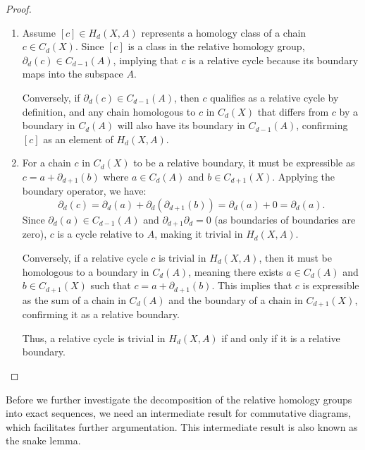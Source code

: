 \begin{proof}
	\begin{enumerate}
		\item Assume $[c] \in H_{d}(X,A)$ represents a homology class of a chain $c \in
			C_{d}(X)$. Since $[c]$ is a class in the relative homology group, $\partial
			_{d}(c) \in C_{d-1}(A)$, implying that $c$ is a relative cycle because its
			boundary maps into the subspace $A$.

			Conversely, if $\partial_{d}(c) \in C_{d-1}(A)$, then $c$ qualifies as a
			relative cycle by definition, and any chain homologous to $c$ in $C_{d}(X)$
			that differs from $c$ by a boundary in $C_{d}(A)$ will also have its boundary
			in $C_{d-1}(A)$, confirming $[c]$ as an element of $H_{d}(X,A)$.

		\item For a chain $c$ in $C_{d}(X)$ to be a relative boundary, it must be
			expressible as $c = a + \partial_{d+1}(b)$ where $a \in C_{d}(A)$ and
			$b \in C_{d+1}(X)$. Applying the boundary operator, we have:
			\[
				\partial_{d}(c) = \partial_{d}(a) + \partial_{d}(\partial_{d+1}(b)) = \partial
				_{d}(a) + 0 = \partial_{d}(a).
			\]
			Since $\partial_{d}(a) \in C_{d-1}(A)$ and $\partial_{d+1}\partial_{d} = 0$
			(as boundaries of boundaries are zero), $c$ is a cycle relative to $A$, making
			it trivial in $H_{d}(X,A)$.

			Conversely, if a relative cycle $c$ is trivial in $H_{d}(X,A)$, then it must
			be homologous to a boundary in $C_{d}(A)$, meaning there exists
			$a \in C_{d}(A)$ and $b \in C_{d+1}(X)$ such that
			$c = a + \partial_{d+1}(b)$. This implies that $c$ is expressible as the sum
			of a chain in $C_{d}(A)$ and the boundary of a chain in $C_{d+1}(X)$,
			confirming it as a relative boundary.

			Thus, a relative cycle is trivial in $H_{d}(X,A)$ if and only if it is a relative
			boundary.
	\end{enumerate}
\end{proof}

Before we further investigate the decomposition of the relative homology groups into exact sequences, we need an intermediate result for commutative diagrams, which facilitates further argumentation. This intermediate result is also known as the snake lemma.

\begin{lemma}
\label{snake}

\end{lemma}

